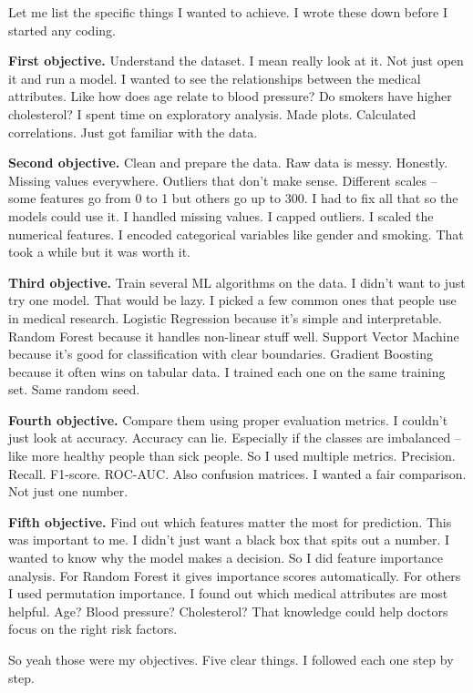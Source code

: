 \documentclass[12pt, a4paper, oneside]{book}
\begin{document}
Let me list the specific things I wanted to achieve. I wrote these down before I started any coding.

\textbf{First objective.} Understand the dataset. I mean really look at it. Not just open it and run a model. I wanted to see the relationships between the medical attributes. Like how does age relate to blood pressure? Do smokers have higher cholesterol? I spent time on exploratory analysis. Made plots. Calculated correlations. Just got familiar with the data.

\textbf{Second objective.} Clean and prepare the data. Raw data is messy. Honestly. Missing values everywhere. Outliers that don't make sense. Different scales -- some features go from 0 to 1 but others go up to 300. I had to fix all that so the models could use it. I handled missing values. I capped outliers. I scaled the numerical features. I encoded categorical variables like gender and smoking. That took a while but it was worth it.

\textbf{Third objective.} Train several ML algorithms on the data. I didn't want to just try one model. That would be lazy. I picked a few common ones that people use in medical research. Logistic Regression because it's simple and interpretable. Random Forest because it handles non-linear stuff well. Support Vector Machine because it's good for classification with clear boundaries. Gradient Boosting because it often wins on tabular data. I trained each one on the same training set. Same random seed.

\textbf{Fourth objective.} Compare them using proper evaluation metrics. I couldn't just look at accuracy. Accuracy can lie. Especially if the classes are imbalanced -- like more healthy people than sick people. So I used multiple metrics. Precision. Recall. F1-score. ROC-AUC. Also confusion matrices. I wanted a fair comparison. Not just one number.

\textbf{Fifth objective.} Find out which features matter the most for prediction. This was important to me. I didn't just want a black box that spits out a number. I wanted to know why the model makes a decision. So I did feature importance analysis. For Random Forest it gives importance scores automatically. For others I used permutation importance. I found out which medical attributes are most helpful. Age? Blood pressure? Cholesterol? That knowledge could help doctors focus on the right risk factors.

So yeah those were my objectives. Five clear things. I followed each one step by step.
\end{document}
